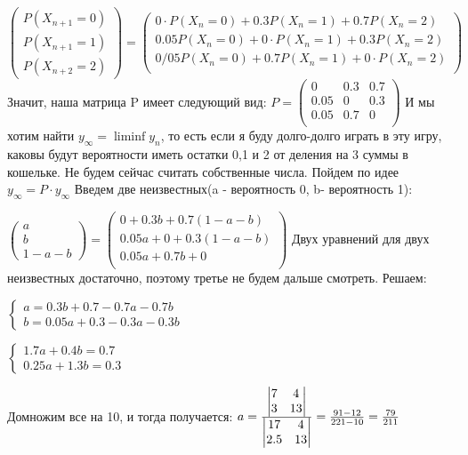 $\left( \begin{array}{l}
		P(X_{n+1}=0)\\
		P(X_{n+1}=1)\\
		P(X_{n+2}=2)
		\end{array} \right)=
\left( \begin{array}{l}
		0\cdot P(X_n=0)+0.3P(X_n=1)+0.7P(X_n=2)\\
		0.05P(X_n=0)+0\cdot P(X_n=1)+0.3P(X_n=2)\\
		0/05P(X_n=0)+0.7P(X_n=1)+0\cdot P(X_n=2)\\
		\end{array} \right) $
Значит, наша матрица P имеет следующий вид:
$P=\left( \begin{array}{lll}
		0    &0.3 & 0.7\\
		0.05 &0 & 0.3\\
		0.05 &0.7 & 0\\
		\end{array} \right) $
И мы хотим найти $y_\infty=\liminf{y_n}$, то есть если я буду долго-долго играть в эту игру, каковы будут вероятности иметь остатки 0,1 и 2 от деления на 3 суммы в кошельке. Не будем сейчас считать собственные числа. Пойдем по идее $y_\infty=P\cdot y_\infty$
Введем две неизвестных(a - вероятность 0, b- вероятность 1): 

$\left( \begin{array}{l}
		a\\
		b\\
		1-a-b
		\end{array} \right)=
\left( \begin{array}{l}
		0+0.3b+0.7(1-a-b)\\
		0.05a+0+0.3(1-a-b)\\
		0.05a+0.7b+0\\
		\end{array} \right) $
Двух уравнений для двух неизвестных достаточно, поэтому третье не будем дальше смотреть.
Решаем:

$\begin{cases}
a  =  0.3b+0.7-0.7a-0.7b \\
b  =  0.05a+0.3-0.3a-0.3b 
\end{cases}
$

$\begin{cases}
1.7a + 0.4b  =  0.7 \\
0.25a + 1.3b  =  0.3 
\end{cases}$





Домножим все на 10, и тогда получается:
$a=\frac{\begin{vmatrix}
	7 & 4\\
	3 & 13
\end{vmatrix}}
{\begin{vmatrix}
	17 & 4\\
	2.5 & 13
\end{vmatrix}}=\frac{91-12}{221-10}=\frac{79}{211}\\ $

